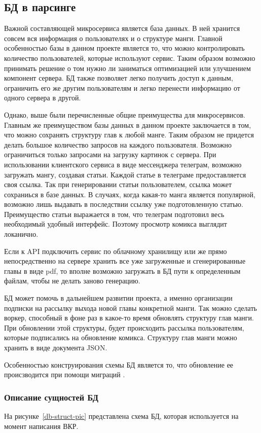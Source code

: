 \subsection{БД в парсинге}
Важной составляющей микросервиса является база данных. 
В ней хранится совсем вся информация о пользователях и о структуре манги.
Главной особенностью базы в данном проекте является то, что можно контролировать количество пользователей, которые используют сервис.
Таким образом возможно принимать решение о том нужно ли заниматься оптимизацией или улучшением компонент сервера. 
БД также позволяет легко получить доступ к данным, ограничить его же другим пользователям и легко перенести информацию от одного сервера в другой.

Однако, выше были перечисленные общие преимущества для микросервисов.
Главным же преимуществом базы данных в данном проекте заключается в том, что можно сохранять структуру глав к любой манге.
Таким образом не придется делать большое количество запросов на каждого пользователя. 
Возможно ограничиться только запросами на загрузку картинок с сервера.
При использовании клиентского сервиса в виде мессенджера телеграм, возможно загружать мангу, создавая статьи.
Каждой статье в телеграме предоставляется своя ссылка. 
Так при генерировании статьи пользователем, ссылка может сохраниься в базе данных. 
В случаях, когда какая-то манга является популярной, возможно лишь выдавать в последствии ссылку уже подготовленную статью.
Преимущество статьи выражается в том, что телеграм подготовил весь необходимый удобный интерфейс. Поэтому просмотр комикса выглядит локанично.

Если к API подключить сервис по облачному хранилищу или же прямо непосредственно на сервере хранить все уже загруженные и сгенерированные главы в виде pdf, 
то вполне возможно загружать в БД пути к определенным файлам, чтобы не делать заново генерацию.

БД может помочь в дальнейшем развитии проекта, а именно организации подписки на рассылку выхода новой главы конкретной манги. 
Так можно сделать воркер, способный в фоне раз в какое-то время обновлять структуру глав манги.
При обновлении этой структуры, будет происходить рассылка пользователям, которые подписались на обновление комикса.
Структуру глав манги можно хранить в виде документа JSON.

Особенностью конструирования схемы БД является то, что обновление ее происзводится при помощи миграций \cite{migrations-cite}.

\subsubsection{Описание сущностей БД}
На рисунке~\ref{db-struct-pic} представлена схема БД, которая используется на момент написания ВКР.

